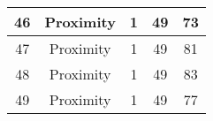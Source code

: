 \documentclass[results.tex]{subfiles}
\begin{document}
\begin{center}
\begin{tabular}{| c || c | c | c | c |}
            \hline
            46                      & Proximity                    & 1                      & 49                      & 73                   \\
            \hline
            47                      & Proximity                    & 1                      & 49                      & 81                   \\
            \hline
            48                      & Proximity                    & 1                      & 49                      & 83                   \\
            \hline
            49                      & Proximity                    & 1                      & 49                      & 77                   \\
            \hline
        \end{tabular}
    \end{center}
\end{document}
